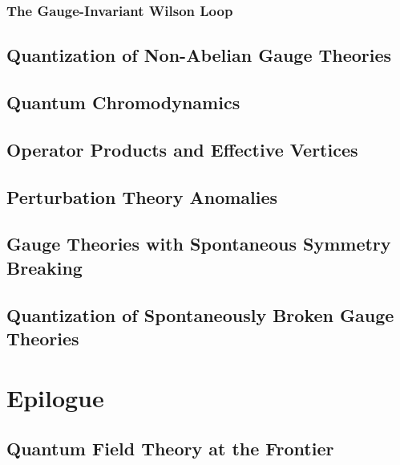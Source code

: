 \documentclass[10pt,b5paper,openany]{book}
\begin{document}
\begin{center}
\end{center}

\section{The Gauge-Invariant Wilson Loop}


\clearpage

\chapter{Quantization of Non-Abelian Gauge Theories}

\chapter{Quantum Chromodynamics}

\chapter{Operator Products and Effective Vertices}

\chapter{Perturbation Theory Anomalies}

\chapter{Gauge Theories with Spontaneous Symmetry Breaking}

\chapter{Quantization of Spontaneously Broken Gauge Theories}

\clearpage %
\part*{Epilogue} %

\chapter{Quantum Field Theory at the Frontier}
\end{document}
